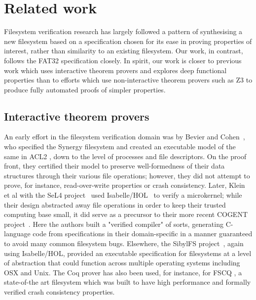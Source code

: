 \documentclass[submission,copyright,creativecommons]{eptcs}
\begin{document}
\section{Related work}

Filesystem verification research has largely followed a pattern of
synthesising a new filesystem based on a specification chosen for its
ease in proving properties of interest, rather than similarity to an
existing filesystem. Our work, in contrast, follows the FAT32
specification closely. In spirit, our work is closer to previous work
which uses interactive theorem provers and explores deep functional
properties than to efforts which use non-interactive theorem provers
such as Z3 to produce fully automated proofs of simpler properties.

\subsection{Interactive theorem provers}
An early effort in the filesystem verification domain was by Bevier
and Cohen~\cite{bevier1996executable}, who specified the Synergy
filesystem and created an executable model of the same in ACL2
\cite{kaufmann2000}, down to the level of processes
and file descriptors. On the proof front, they certified their model
to preserve well-formedness of their data structures through their
various file operations; however, they did not attempt to prove, for
instance, read-over-write properties or crash consistency. Later,
Klein et al with the SeL4 project~\cite{klein2009sel4} used
Isabelle/HOL~\cite{nipkow2002isabelle} to verify a microkernel;
while their design abstracted away file operations in order to keep
their trusted computing base small, it did serve as a precursor to their
more recent COGENT project~\cite{amani2016cogent}. Here the authors
built a "verified compiler" of sorts, generating C-language code from
specifications in their domain-specific in a manner guaranteed to
avoid many common filesystem bugs. Elsewhere, the SibylFS
project~\cite{ridge2015sibylfs}, again using Isabelle/HOL, provided
an executable specification for filesystems at a level of abstraction
that could function across multiple operating systems including OSX
and Unix. The Coq prover \cite{bertot2013interactive} has also been
used, for instance, for FSCQ
\cite{DBLP:conf/usenix/ChenZCCKZ16}, a state-of-the art filesystem
which was built to have high performance and formally verified crash
consistency properties.
\end{document}
